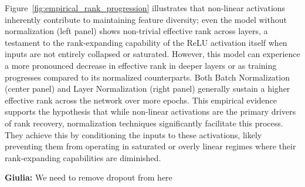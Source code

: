 \documentclass{article}
\newcommand{\giulia}[1]{{\color{ForestGreen}\textbf{Giulia:} #1}}
\begin{document}
Figure~\ref{fig:empirical_rank_progression} illustrates that non-linear activations inherently contribute to maintaining feature diversity; even the model without normalization (left panel) shows non-trivial effective rank across layers, a testament to the rank-expanding capability of the ReLU activation itself when inputs are not entirely collapsed or saturated. However, this model can experience a more pronounced decrease in effective rank in deeper layers or as training progresses compared to its normalized counterparts. Both Batch Normalization (center panel) and Layer Normalization (right panel) generally sustain a higher effective rank across the network over more epochs. This empirical evidence supports the hypothesis that while non-linear activations are the primary drivers of rank recovery, normalization techniques significantly facilitate this process. They achieve this by conditioning the inputs to these activations, likely preventing them from operating in saturated or overly linear regimes where their rank-expanding capabilities are diminished.


\giulia{We need to remove dropout from here}
\end{document}
